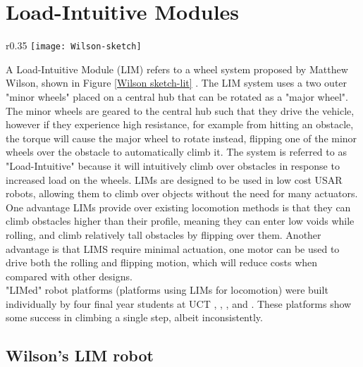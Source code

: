 \section{Load-Intuitive Modules} %

\begin{wrapfigure}{r}{0.35\textwidth} %
	\centering
	\texttt{[image: Wilson-sketch]}
	\caption{Systems layout of Wilson's LIM device \citep{Wilson-2013}}
	\label{Wilson sketch-lit}
\end{wrapfigure}

A Load-Intuitive Module (LIM) refers to a wheel system proposed by Matthew Wilson, shown in Figure \ref{Wilson sketch-lit} \citep{Wilson-2013}. The LIM system uses a two outer "minor wheels" placed on a central hub that can be rotated as a "major wheel". The minor wheels are geared to the central hub such that they drive the vehicle, however if they experience high resistance, for example from hitting an obstacle, the torque will cause the major wheel to rotate instead, flipping one of the minor wheels over the obstacle to automatically climb it. The system is referred to as "Load-Intuitive" because it will intuitively climb over obstacles in response to increased load on the wheels. LIMs are designed to be used in low cost USAR robots, allowing them to climb over objects without the need for many actuators.\\

One advantage LIMs provide over existing locomotion methods is that they can climb obstacles higher than their profile, meaning they can enter low voids while rolling, and climb relatively tall obstacles by flipping over them. Another advantage is that LIMS require minimal actuation, one motor can be used to drive both the rolling and flipping motion, which will reduce costs when compared with other designs.\\

\noindent "LIMed" robot platforms (platforms using LIMs for locomotion) were built individually by four final year students at UCT \citep{Wilson-2013}, \citep{Haskel-2017}, \citep{Buchanan-2018}, and \citep{Powrie-2019}. These platforms show some success in climbing a single step, albeit inconsistently.

\subsection{Wilson's LIM robot} %

